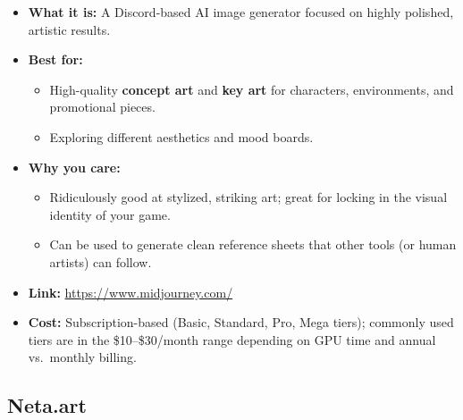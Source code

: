 \documentclass[11pt]{article}
\begin{document}
\begin{itemize}
    \item \textbf{What it is:} A Discord-based AI image generator focused on highly polished, artistic results.
    \item \textbf{Best for:}
    \begin{itemize}
        \item High-quality \textbf{concept art} and \textbf{key art} for characters, environments, and promotional pieces.
        \item Exploring different aesthetics and mood boards.
    \end{itemize}
    \item \textbf{Why you care:}
    \begin{itemize}
        \item Ridiculously good at stylized, striking art; great for locking in the visual identity of your game.
        \item Can be used to generate clean reference sheets that other tools (or human artists) can follow.
    \end{itemize}
    \item \textbf{Link:} \url{https://www.midjourney.com/}
    \item \textbf{Cost:} Subscription-based (Basic, Standard, Pro, Mega tiers); commonly used tiers are in the \$10--\$30/month range depending on GPU time and annual vs.\ monthly billing.
\end{itemize}

\subsection{Neta.art}
\end{document}
